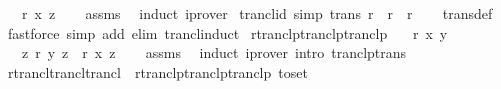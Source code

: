 \begin{isabellebody}
\ \ \ {\isachardoublequoteopen}r\isactrlsup {\isacharplus}{\kern0pt}\isactrlsup {\isacharplus}{\kern0pt}\ x\ z{\isachardoublequoteclose}\isanewline
%
\isadelimproof
\ \ %
\endisadelimproof
%
\isatagproof
{}\isamarkupfalse%
\ assms{\isacharparenleft}{\kern0pt}{}{\isacharcomma}{\kern0pt}{}{\isacharparenright}{\kern0pt}\ \isamarkupfalse%
\ induct\ iprover{\isacharplus}{\kern0pt}%
\endisatagproof
{\isafoldproof}%
%
\isadelimproof
\isanewline
%
\endisadelimproof
\isanewline
{}\isamarkupfalse%
\ trancl{\isacharunderscore}{\kern0pt}id\ {\isacharbrackleft}{\kern0pt}simp{\isacharbrackright}{\kern0pt}{\isacharcolon}{\kern0pt}\ {\isachardoublequoteopen}trans\ r\ {\isasymLongrightarrow}\ r\isactrlsup {\isacharplus}{\kern0pt}\ {\isacharequal}{\kern0pt}\ r{\isachardoublequoteclose}\isanewline
%
\isadelimproof
\ \ %
\endisadelimproof
%
\isatagproof
{}\isamarkupfalse%
\ trans{\isacharunderscore}{\kern0pt}def\ \isamarkupfalse%
\ {\isacharparenleft}{\kern0pt}fastforce\ simp\ add{\isacharcolon}{\kern0pt}\ elim{\isacharcolon}{\kern0pt}\ trancl{\isacharunderscore}{\kern0pt}induct{\isacharparenright}{\kern0pt}%
\endisatagproof
{\isafoldproof}%
%
\isadelimproof
\isanewline
%
\endisadelimproof
\isanewline
{}\isamarkupfalse%
\ rtranclp{\isacharunderscore}{\kern0pt}tranclp{\isacharunderscore}{\kern0pt}tranclp{\isacharcolon}{\kern0pt}\isanewline
\ \ \ {\isachardoublequoteopen}r\isactrlsup {\isacharasterisk}{\kern0pt}\isactrlsup {\isacharasterisk}{\kern0pt}\ x\ y{\isachardoublequoteclose}\isanewline
\ \ \ {\isachardoublequoteopen}{\isasymAnd}z{\isachardot}{\kern0pt}\ r\isactrlsup {\isacharplus}{\kern0pt}\isactrlsup {\isacharplus}{\kern0pt}\ y\ z\ {\isasymLongrightarrow}\ r\isactrlsup {\isacharplus}{\kern0pt}\isactrlsup {\isacharplus}{\kern0pt}\ x\ z{\isachardoublequoteclose}\isanewline
%
\isadelimproof
\ \ %
\endisadelimproof
%
\isatagproof
{}\isamarkupfalse%
\ assms\ \isamarkupfalse%
\ induct\ {\isacharparenleft}{\kern0pt}iprover\ intro{\isacharcolon}{\kern0pt}\ tranclp{\isacharunderscore}{\kern0pt}trans{\isacharparenright}{\kern0pt}{\isacharplus}{\kern0pt}%
\endisatagproof
{\isafoldproof}%
%
\isadelimproof
\isanewline
%
\endisadelimproof
\isanewline
{}\isamarkupfalse%
\ rtrancl{\isacharunderscore}{\kern0pt}trancl{\isacharunderscore}{\kern0pt}trancl\ {\isacharequal}{\kern0pt}\ rtranclp{\isacharunderscore}{\kern0pt}tranclp{\isacharunderscore}{\kern0pt}tranclp\ {\isacharbrackleft}{\kern0pt}to{\isacharunderscore}{\kern0pt}set{\isacharbrackright}{\kern0pt}\isanewline

\end{isabellebody}
